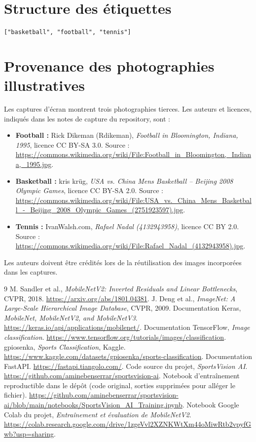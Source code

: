 \documentclass[11pt,a4paper,oneside]{report}
\begin{document}
\section{Structure des étiquettes}
\begin{lstlisting}
["basketball", "football", "tennis"]
\end{lstlisting}
\section{Provenance des photographies illustratives}
Les captures d'écran montrent trois photographies tierces. Les auteurs et licences, indiqués dans les notes de capture du repository, sont :
\begin{itemize}
\item \textbf{Football :} Rick Dikeman (Rdikeman), \emph{Football in Bloomington, Indiana, 1995}, licence CC BY-SA 3.0. Source : \url{https://commons.wikimedia.org/wiki/File:Football_in_Bloomington,_Indiana,_1995.jpg}.
\item \textbf{Basketball :} kris krüg, \emph{USA vs. China Mens Basketball -- Beijing 2008 Olympic Games}, licence CC BY-SA 2.0. Source : \url{https://commons.wikimedia.org/wiki/File:USA_vs._China_Mens_Basketball_-_Beijing_2008_Olympic_Games_(2751923597).jpg}.
\item \textbf{Tennis :} IvanWalsh.com, \emph{Rafael Nadal (4132943958)}, licence CC BY 2.0. Source : \url{https://commons.wikimedia.org/wiki/File:Rafael_Nadal_(4132943958).jpg}.
\end{itemize}
Les auteurs doivent être crédités lors de la réutilisation des images incorporées dans les captures.

\begin{thebibliography}{9}
 M. Sandler et al., \emph{MobileNetV2: Inverted Residuals and Linear Bottlenecks}, CVPR, 2018. \url{https://arxiv.org/abs/1801.04381}.
 J. Deng et al., \emph{ImageNet: A Large-Scale Hierarchical Image Database}, CVPR, 2009.
 Documentation Keras, \emph{MobileNet, MobileNetV2, and MobileNetV3}. \url{https://keras.io/api/applications/mobilenet/}.
 Documentation TensorFlow, \emph{Image classification}. \url{https://www.tensorflow.org/tutorials/images/classification}.
 gpiosenka, \emph{Sports Classification}, Kaggle. \url{https://www.kaggle.com/datasets/gpiosenka/sports-classification}.
 Documentation FastAPI. \url{https://fastapi.tiangolo.com/}.
 Code source du projet, \emph{SportsVision AI}. \url{https://github.com/aminebenserrar/sportsvision-ai}.
 Notebook d'entraînement reproductible dans le dépôt (code original, sorties supprimées pour alléger le fichier). \url{https://github.com/aminebenserrar/sportsvision-ai/blob/main/notebooks/SportsVision_AI_Training.ipynb}.
 Notebook Google Colab du projet, \emph{Entraînement et évaluation de MobileNetV2}. \url{https://colab.research.google.com/drive/1zgeVvl2XZNKWtXm44oMiwRtb2vpyfGwb?usp=sharing}.
\end{thebibliography}
\end{document}
